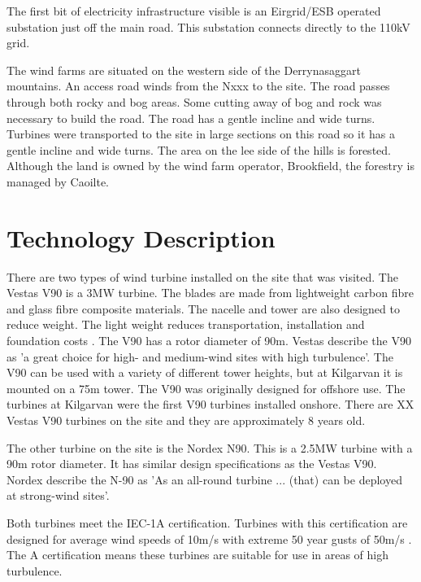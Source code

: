 \documentclass[12pt]{article} %
\begin{document}
The first bit of electricity infrastructure visible is an Eirgrid/ESB operated substation just off the main road. This substation connects directly to the 110kV grid.

The wind farms are situated on the western side of the Derrynasaggart mountains. An access road winds from the Nxxx to the site. The road passes through both rocky and bog areas. Some cutting away of bog and rock was necessary to build the road. The road has a gentle incline and wide turns. Turbines were transported to the site in large sections on this road so it has a gentle incline and wide turns.
The area on the lee side of the hills is forested. Although the land is owned by the wind farm operator, Brookfield, the forestry is managed by Caoilte.





\section{Technology Description}
There are two types of wind turbine installed on the site that was visited. The Vestas V90 is a 3MW turbine. The blades are made from lightweight carbon fibre and glass fibre composite materials. The nacelle and tower are also designed to reduce weight. The light weight reduces transportation, installation and foundation costs \cite{v90-3.0}. The V90 has a rotor diameter of 90m.
Vestas \cite{v90-3.0} describe the V90 as 'a great choice for high- and medium-wind sites with high turbulence'. 
The V90 can be used with a variety of different tower heights, but at Kilgarvan it is mounted on a 75m tower. The V90 was originally designed for offshore use. The turbines at Kilgarvan were the first V90 turbines installed onshore.
There are XX Vestas V90 turbines on the site and they are approximately 8 years old.

The other turbine on the site is the Nordex N90. This is a 2.5MW turbine with a 90m rotor diameter. It has similar design specifications as the Vestas V90. Nordex \cite{n90} describe the N-90 as 'As an all-round turbine ... (that) can be deployed at strong-wind sites'.

Both turbines meet the IEC-1A certification. Turbines with this certification are designed for average wind speeds of 10m/s with extreme 50 year gusts of 50m/s \cite{burton_wind_2001}. The A certification means these turbines are suitable for use in areas of high turbulence.
\end{document}
